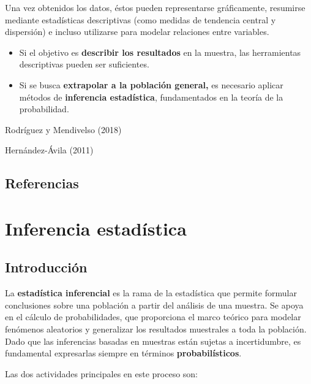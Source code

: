 \documentclass[
  spanish,
  a4paper,
]{scrbook}
\begin{document}
Una vez obtenidos los datos, éstos pueden representarse gráficamente,
resumirse mediante estadísticas descriptivas (como medidas de tendencia
central y dispersión) e incluso utilizarse para modelar relaciones entre
variables.

\begin{itemize}
\item
  Si el objetivo es \textbf{describir los resultados} en la muestra, las
  herramientas descriptivas pueden ser suficientes.
\item
  Si se busca \textbf{extrapolar a la población general,} es necesario
  aplicar métodos de \textbf{inferencia estadística}, fundamentados en
  la teoría de la probabilidad.
\end{itemize}

Rodríguez y Mendivelso (2018)

Hernández-Ávila (2011)

\section{Referencias}\label{referencias-5}

\chapter{Inferencia estadística}\label{inferencia-estaduxedstica}

\section{Introducción}\label{introducciuxf3n-5}

La \textbf{estadística inferencial} es la rama de la estadística que
permite formular conclusiones sobre una población a partir del análisis
de una muestra. Se apoya en el cálculo de probabilidades, que
proporciona el marco teórico para modelar fenómenos aleatorios y
generalizar los resultados muestrales a toda la población. Dado que las
inferencias basadas en muestras están sujetas a incertidumbre, es
fundamental expresarlas siempre en términos \textbf{probabilísticos}.

Las dos actividades principales en este proceso son:
\end{document}
